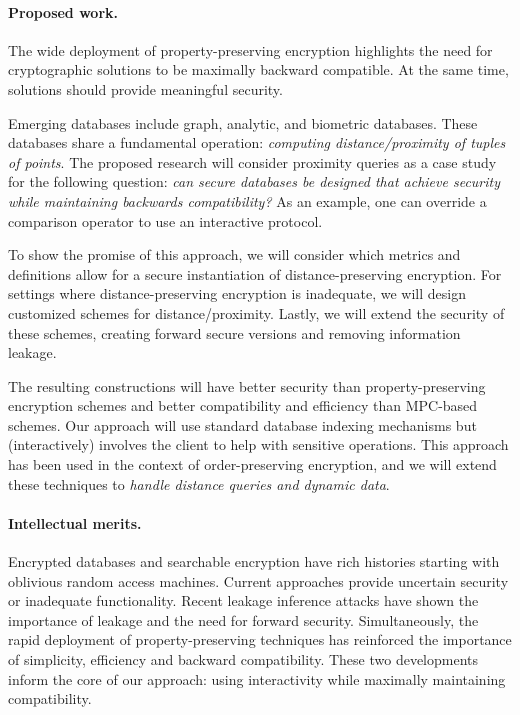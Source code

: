 \documentclass[11pt]{article}
\begin{document}
\paragraph{Proposed work.}
The wide deployment of property-preserving encryption highlights the need for cryptographic solutions to be maximally backward compatible.  At the same time, solutions should provide meaningful security.

Emerging databases include graph, analytic, and
biometric databases. These databases share a fundamental operation: {\em
computing distance/proximity of tuples of points}. The proposed research will
consider proximity queries as a case study for the following question: \emph{can secure databases be designed that achieve security while maintaining backwards compatibility?}  As an example, one can override a comparison operator to use an interactive protocol.

To show the promise of this approach, we will consider which metrics and definitions allow for a secure instantiation of distance-preserving encryption. For settings where distance-preserving encryption is inadequate, we will design
customized schemes for distance/proximity. Lastly, we will extend the security of these schemes, creating forward secure versions and removing information leakage.

The resulting constructions will have
better security than property-preserving encryption schemes and better compatibility and 
efficiency than MPC-based schemes. Our approach will use standard database indexing mechanisms but (interactively) involves the
client to help with sensitive operations. This approach has been used in the
context of order-preserving encryption, and we will extend these techniques to
{\em handle distance queries and dynamic data}.

%
%

\paragraph{Intellectual merits.}  
Encrypted databases and searchable encryption have rich histories starting with  oblivious random access machines.  Current approaches provide uncertain security or inadequate functionality.  Recent
leakage inference attacks have shown the importance of leakage and the need for forward
security.  Simultaneously, the rapid deployment of property-preserving
techniques has reinforced the importance of simplicity, efficiency and backward
compatibility.  These two developments inform the core of our approach: using
interactivity while maximally maintaining compatibility.
\end{document}

